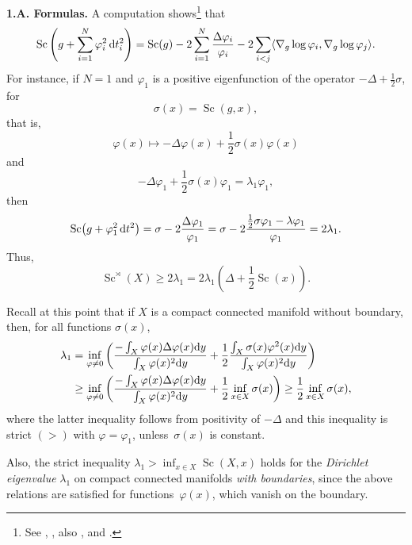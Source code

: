 \documentclass[10pt,a4paper]{amsart}
\numberwithin{equation}{section}
\begin{document}
\textbf {1.A. Formulas.} A computation shows\footnote{See \cite{F-CS1980}, \cite[formulas~(7.33) and (12.5)]{GL1983}, also \cite{Zhu2019}, and  \cite[Section~2.4.1]{Gr2021}.} that
\[
\operatorname{Sc}\left(g+\sum_{i=1}^N\varphi_i^2\,{\rm d}t_i^2\right)= \operatorname{Sc}(g)-2\sum^N_{i=1} \frac{\Delta\varphi_i} {\varphi_i}-2\sum_{i<j}
 \langle\nabla_g\log\varphi_i,\nabla_g\log\varphi_j
 \rangle.
 \]
 For instance, if $N=1$ and $\varphi_1$ is a positive eigenfunction of the operator
 $-\Delta+\frac{1}{2}\sigma$, for
\[
\sigma(x)=\operatorname{Sc}(g,x),
\]
that is,
\[
\varphi(x)\mapsto -\Delta \varphi(x) +\frac{1}{2}\sigma(x)\varphi(x)
\]
 and
\[
-\Delta \varphi_1 +\frac{1}{2}\sigma(x)\varphi_1=\lambda_1\varphi_1,
\]
 then
 \[
 \operatorname{Sc}\bigl(g+\varphi_1^2\,{\rm d}t^2\bigr)
 =\sigma -2\frac {\Delta\varphi_1} {\varphi_1}=\sigma -2 \frac{\frac{1}{2}\sigma\varphi_1- \lambda \varphi_1}{
 \varphi_1} =2\lambda_1.
 \]
Thus,
\[
\operatorname{Sc}^\rtimes (X)\geq 2\lambda_1=2\lambda_1\left(\Delta+\frac{1}{2}\operatorname{Sc}(x)\right).
\]

Recall at this point that if $X$ is a compact connected manifold without boundary, then, for all functions $\sigma(x)$,
\begin{align*}
\lambda_1& =\inf_{\varphi\neq 0}\left(\frac {-\int_X\varphi(x) \Delta \varphi(x){\rm d}y} {\int_X\varphi(x)^2{\rm d}y}+
 \frac12\frac {\int_X
 \sigma(x)\varphi^2(x){\rm d}y}{\int_X\varphi(x)^2{\rm d}y} \right)\\
 & \geq
\inf_{\varphi\neq 0}\left(\frac {-\int_X\varphi(x) \Delta \varphi(x){\rm d}y} {\int_X\varphi(x)^2{\rm d}y}+\frac12
 \inf_{x\in X}\sigma(x)\right) \geq \frac12\inf_{x\in X}\sigma(x),
\end{align*}
 where the latter inequality follows from positivity of $-\Delta$ and this inequality is strict $(>)$ with $\varphi=\varphi_1$, unless~$\sigma(x)$ is constant.

Also, the strict inequality $\lambda_1> \inf_{x\in X}\operatorname{Sc}(X,x)$ holds for the {\it Dirichlet eigenvalue} $\lambda_1$
 on compact connected manifolds {\it with boundaries},
 since the above relations
 are satisfied for functions~$\varphi (x)$, which vanish on the boundary.
\end{document}
